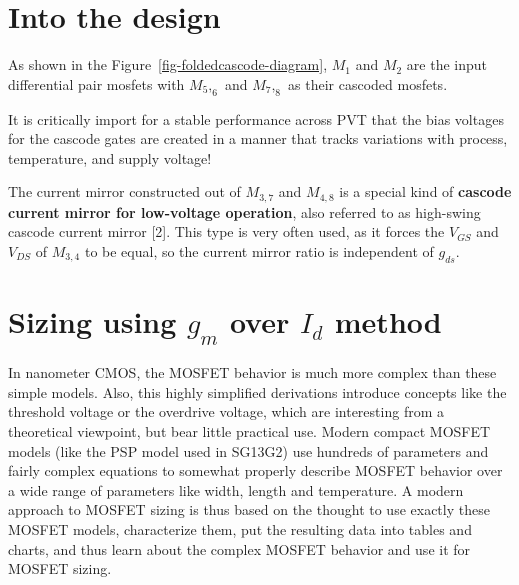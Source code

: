 \documentclass[
  11pt,
  a4paper,
  oneside]{scrbook}
\begin{document}
\section{Into the design}\label{into-the-design}

As shown in the Figure~\ref{fig-foldedcascode-diagram}, \(M_1\) and
\(M_2\) are the input differential pair mosfets with \(M_5,_6\) and
\(M_7,_8\) as their cascoded mosfets.

\begin{tcolorbox}[enhanced jigsaw, opacityback=0, breakable, colback=white, left=2mm, toprule=.15mm, arc=.35mm, coltitle=black, leftrule=.75mm, colbacktitle=quarto-callout-important-color!10!white, rightrule=.15mm, colframe=quarto-callout-important-color-frame, titlerule=0mm, title=\textcolor{quarto-callout-important-color}{\faExclamation}\hspace{0.5em}{Cascode Bias Voltage Generation}, toptitle=1mm, bottomtitle=1mm, bottomrule=.15mm, opacitybacktitle=0.6]

It is critically import for a stable performance across PVT that the
bias voltages for the cascode gates are created in a manner that tracks
variations with process, temperature, and supply voltage!

\end{tcolorbox}

The current mirror constructed out of \(M_\mathrm{3,7}\) and
\(M_\mathrm{4,8}\) is a special kind of \textbf{cascode current mirror
for low-voltage operation}, also referred to as high-swing cascode
current mirror {[}2{]}. This type is very often used, as it forces the
\(V_{GS}\) and \(V_{DS}\) of \(M_{3,4}\) to be equal, so the current
mirror ratio is independent of \(g_{ds}\).

\section{\texorpdfstring{Sizing using \(g_{m}\) over \(I_d\)
method}{Sizing using g\_\{m\} over I\_d method}}\label{sec-gmid-method}

In nanometer CMOS, the MOSFET behavior is much more complex than these
simple models. Also, this highly simplified derivations introduce
concepts like the threshold voltage or the overdrive voltage, which are
interesting from a theoretical viewpoint, but bear little practical use.
Modern compact MOSFET models (like the PSP model used in SG13G2) use
hundreds of parameters and fairly complex equations to somewhat properly
describe MOSFET behavior over a wide range of parameters like width,
length and temperature. A modern approach to MOSFET sizing is thus based
on the thought to use exactly these MOSFET models, characterize them,
put the resulting data into tables and charts, and thus learn about the
complex MOSFET behavior and use it for MOSFET sizing.
\end{document}
